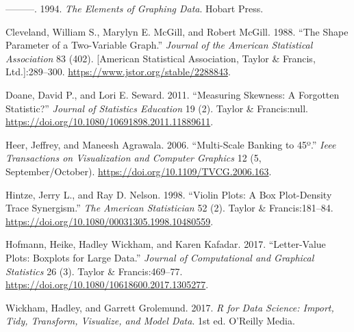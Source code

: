 \documentclass[]{book}
\theoremstyle{plain}
\theoremstyle{remark}
\begin{document}
\leavevmode\hypertarget{ref-Cleveland1994}{}%
---------. 1994. \emph{The Elements of Graphing Data}. Hobart Press.

\leavevmode\hypertarget{ref-ClevelandMcGillMcGill1988}{}%
Cleveland, William S., Marylyn E. McGill, and Robert McGill. 1988. ``The
Shape Parameter of a Two-Variable Graph.'' \emph{Journal of the American
Statistical Association} 83 (402). {[}American Statistical Association,
Taylor \& Francis, Ltd.{]}:289--300.
\url{https://www.jstor.org/stable/2288843}.

\leavevmode\hypertarget{ref-DoaneSeward2011}{}%
Doane, David P., and Lori E. Seward. 2011. ``Measuring Skewness: A
Forgotten Statistic?'' \emph{Journal of Statistics Education} 19 (2).
Taylor \& Francis:null.
\url{https://doi.org/10.1080/10691898.2011.11889611}.

\leavevmode\hypertarget{ref-HeerAgrawala2006}{}%
Heer, Jeffrey, and Maneesh Agrawala. 2006. ``Multi-Scale Banking to
45º.'' \emph{Ieee Transactions on Visualization and Computer Graphics}
12 (5, September/October). \url{https://doi.org/10.1109/TVCG.2006.163}.

\leavevmode\hypertarget{ref-HintzeNelson1998}{}%
Hintze, Jerry L., and Ray D. Nelson. 1998. ``Violin Plots: A Box
Plot-Density Trace Synergism.'' \emph{The American Statistician} 52 (2).
Taylor \& Francis:181--84.
\url{https://doi.org/10.1080/00031305.1998.10480559}.

\leavevmode\hypertarget{ref-HofmannWickhamKafadar2017}{}%
Hofmann, Heike, Hadley Wickham, and Karen Kafadar. 2017. ``Letter-Value
Plots: Boxplots for Large Data.'' \emph{Journal of Computational and
Graphical Statistics} 26 (3). Taylor \& Francis:469--77.
\url{https://doi.org/10.1080/10618600.2017.1305277}.

\leavevmode\hypertarget{ref-WickhamGrolemund2017}{}%
Wickham, Hadley, and Garrett Grolemund. 2017. \emph{R for Data Science:
Import, Tidy, Transform, Visualize, and Model Data}. 1st ed. O'Reilly
Media.
\end{document}

